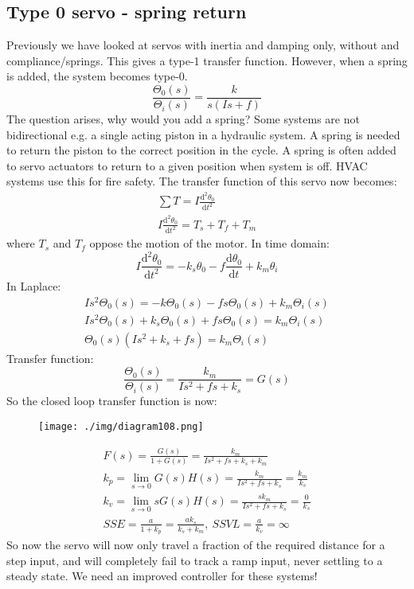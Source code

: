\subsection{Type 0 servo - spring return}
Previously we have looked at servos with inertia and damping only, without and compliance/springs. This gives a type-1 transfer function. However, when a spring is added, the system becomes type-0.
\begin{equation}
  \frac{\Theta_0(s)}{\Theta_i(s)} = \frac{k}{s(Is + f)}
\end{equation}
The question arises, why would you add a spring? Some systems are not bidirectional e.g. a single acting piston in a hydraulic system. A spring is needed to return the piston to the correct position in the cycle. A spring is often added to servo actuators to return to a given position when system is off. HVAC systems use this for fire safety. The transfer function of this servo now becomes:
\begin{gather}
  \sum T = I \frac{\textrm{d}^2 \theta_0}{\textrm{d} t^2}\\
  I \frac{\textrm{d}^2 \theta_0}{\textrm{d}t^2} = T_s + T_f + T_m
\end{gather}
where $T_s$ and $T_f$ oppose the motion of the motor. In time domain:
\begin{equation}
  I \frac{\textrm{d}^2 \theta_0}{\textrm{d}t^2} = - k_s \theta_0 - f \frac{\textrm{d}\theta_0}{\textrm{d} t} + k_m \theta_i
\end{equation}
In Laplace:
\begin{gather}
  Is^2\Theta_0(s) = -k\Theta_0(s) - fs\Theta_0(s)+ k_m\Theta_i(s)\\
  Is^2 \Theta_0(s) + k_s \Theta_0(s) + fs\Theta_0(s) = k_m \Theta_i(s)\\
  \Theta_0(s) \left(Is^2 + k_s + fs\right) = k_m \Theta_i(s)
\end{gather}
Transfer function:
\begin{equation}
  \frac{\Theta_0(s)}{\Theta_i(s)} = \frac{k_m}{Is^2 + fs + k_s} = G(s)
\end{equation}
So the closed loop transfer function is now:
\begin{figure}[H]
  \centerline{\texttt{[image: ./img/diagram108.png]}}
  \caption{}
\end{figure}
\begin{gather}
  F(s) = \frac{G(s)}{1 + G(s)} = \frac{k_m}{Is^2 + fs + k_s + k_m}\\
  k_p = \lim_{s\rightarrow 0}G(s)H(s) = \frac{k_m}{Is^2 + fs+ k_s} = \frac{k_m}{k_s}\\
  k_v = \lim_{s\rightarrow 0} sG(s) H(s) = \frac{sk_m}{Is^2 + fs + k_s} = \frac{0}{k_s}\\
  SSE = \frac{a}{1 + k_p} = \frac{ak_s}{k_s + k_m}, \ SSVL = \frac{a}{k_v} = \infty
\end{gather}
So now the servo will now only travel a fraction of the required distance for a step input, and will completely fail to track a ramp input, never settling to a steady state. We need an improved controller for these systems!
